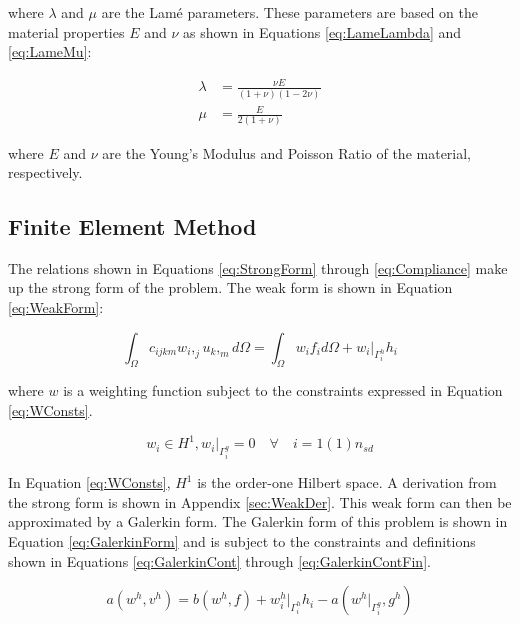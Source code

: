 \documentclass[a4paper, 12pt]{article}
\begin{document}
\noindent
where $\lambda$ and $\mu$ are the Lam\'e parameters.
These parameters are based on the material properties $E$ and $\nu$
as shown in Equations \ref{eq:LameLambda} and \ref{eq:LameMu}:

\begin{align}
\lambda &= \frac{ \nu E }{(1+\nu) (1-2\nu) }
  \label{eq:LameLambda} \\
\mu &= \frac{ E}{ 2( 1+\nu)}
  \label{eq:LameMu}
\end{align}

\noindent
where $E$ and $\nu$ are the Young's Modulus and Poisson Ratio
of the material, respectively.

\subsection{Finite Element Method} \label{subsec:fem}
The relations shown in Equations \ref{eq:StrongForm} through
\ref{eq:Compliance} make up the strong form of the problem.
The weak form is shown in Equation \ref{eq:WeakForm}:

\begin{equation} \label{eq:WeakForm}
\int_{\Omega} c_{ijkm} w_{i},_{j} u_{k},_{m} d\Omega =
  \int_{\Omega} w_{i} f_{i} d\Omega +
  w_{i}\Big|_{\Gamma^{h}_{i}} h_{i}
\end{equation}

\noindent
where $w$ is a weighting function subject to the constraints
expressed in Equation \ref{eq:WConsts}.

\begin{equation} \label{eq:WConsts}
w_{i} \in H^1, w_{i}\Big|_{\Gamma^{g}_{i}} = 0
    \quad \forall \quad i=1(1)n_{sd}
\end{equation}

\noindent
In Equation \ref{eq:WConsts}, $H^{1}$ is the order-one Hilbert space.
A derivation from the strong form is shown in Appendix \ref{sec:WeakDer}.
This weak form can then be approximated by a Galerkin form. 
The Galerkin form of this problem is shown in Equation 
\ref{eq:GalerkinForm} and is subject to the constraints and definitions
shown in Equations \ref{eq:GalerkinCont}
through  \ref{eq:GalerkinContFin}.

\begin{equation} \label{eq:GalerkinForm}
a(w^{h} , v^{h})
  = b(w^{h} , f) 
  + w^{h}_{i}\Big|_{\Gamma^{h}_{i}} h_{i} 
  - a(w^{h}\Big|_{\Gamma^{g}_{i}} , g^{h})
\end{equation}
\end{document}
